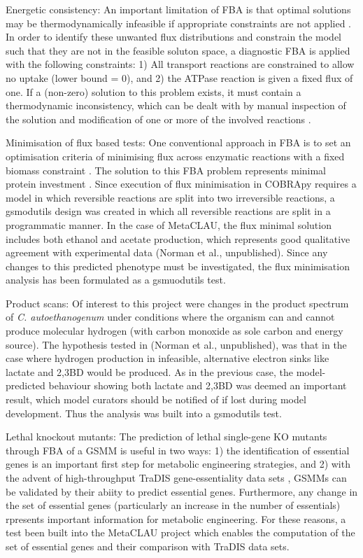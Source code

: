 \documentclass[a4paper,10pt]{article}
\begin{document}
Energetic consistency: An important limitation of FBA is that optimal solutions may be thermodynamically infeasible if appropriate constraints are not applied \cite{Fell1197rohtua}. In order to identify these unwanted flux distributions and constrain the model such that they are not in the feasible soluton space, a diagnostic FBA is applied with the following constraints: 1) All transport reactions are constrained to allow no uptake (lower bound = 0), and 2) the ATPase reaction is given a fixed flux of one. If a (non-zero) solution to this problem exists, it must contain a thermodynamic inconsistency, which can be dealt with by manual inspection of the solution and modification of one or more of the involved reactions \cite{Fell1197rohtua}.
 
Minimisation of flux based tests: One conventional approach in FBA is to set an optimisation criteria of minimising flux across enzymatic reactions with a fixed biomass constraint \cite{holzhutter2006thegeneralised}. The solution to this FBA problem represents minimal protein investment \cite{holzhutter2006thegeneralised}. Since execution of flux minimisation in COBRApy requires a model in which reversible reactions are split into two irreversible reactions, a gsmodutils design was created in which all reversible reactions are split in a programmatic manner. In the case of MetaCLAU, the flux minimal solution includes both ethanol and acetate production, which represents good qualitative agreement with experimental data (Norman et al., unpublished). Since any changes to this predicted phenotype must be investigated, the flux minimisation analysis has been formulated as a gsmuodutils test.

Product scans: Of interest to this project were changes in the product spectrum of \textit{C. autoethanogenum} under conditions where the organism can and cannot produce molecular hydrogen (with carbon monoxide as sole carbon and energy source). The hypothesis tested in (Norman et al., unpublished), was that in the case where hydrogen production in infeasible, alternative electron sinks like lactate and 2,3BD would be produced. As in the previous case, the model-predicted behaviour showing both lactate and 2,3BD was deemed an important result, which model curators should be notified of if lost during model development. Thus the analysis was built into a gsmodutils test.

Lethal knockout mutants: The prediction of lethal single-gene KO mutants through FBA of a GSMM is useful in two ways: 1) the identification of essential genes is an important first step for metabolic engineering strategies, and 2) with the advent of high-throughput TraDIS gene-essentiality data sets \cite{langridge2009simultaneous}, GSMMs can be validated by their abiity to predict essential genes. Furthermore, any change in the set of essential genes (particularly an increase in the number of essentials) rpresents important information for metabolic engineering. For these reasons, a test been built into the MetaCLAU project which enables the computation of the set of essential genes and their comparison with TraDIS data sets.
\end{document}
